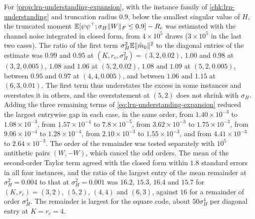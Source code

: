 \begin{numcheck}\label{chk:lrn-expansion}
For \cref{prop:lrn-understanding-expansion}, with the instance family of \cref{chk:lrn-understanding} and truncation radius $0.9$, below the smallest singular value of $H$, the truncated moment $\mathbb{E}[\psi\psi^\top;\sigma_H\Vert W\Vert_F\le0.9]-R_c$ was estimated with the channel noise integrated in closed form, from $4\times10^5$ draws ($3\times10^5$ in the last two cases). The ratio of the first term $\sigma_H^2\mathbb{E}\Vert\hat m_0\Vert^2$ to the diagonal entries of the estimate was $0.99$ and $0.95$ at $(K,r_c,\sigma_H^2)=(3,2,0.02)$, $1.00$ and $0.98$ at $(3,2,0.005)$, $1.08$ and $1.06$ at $(5,2,0.02)$, $1.08$ and $1.09$ at $(5,2,0.005)$, between $0.95$ and $0.97$ at $(4,4,0.005)$, and between $1.06$ and $1.15$ at $(6,3,0.01)$. The first term thus understates the excess in some instances and overstates it in others, and the overstatement at $(5,2)$ does not shrink with $\sigma_H$. Adding the three remaining terms of \cref{eq:lrn-understanding-expansion} reduced the largest entrywise gap in each case, in the same order, from $1.40\times10^{-3}$ to $1.08\times10^{-3}$, from $1.57\times10^{-4}$ to $7.8\times10^{-5}$, from $3.62\times10^{-3}$ to $1.75\times10^{-3}$, from $9.06\times10^{-4}$ to $1.28\times10^{-4}$, from $2.10\times10^{-3}$ to $1.55\times10^{-3}$, and from $4.41\times10^{-3}$ to $2.64\times10^{-3}$. The order of the remainder was tested separately with $10^5$ antithetic pairs $(W,-W)$, which cancel the odd orders. The mean of the second-order Taylor term agreed with the closed form within $1.8$ standard errors in all four instances, and the ratio of the largest entry of the mean remainder at $\sigma_H^2=0.004$ to that at $\sigma_H^2=0.001$ was $16.2$, $15.3$, $16.4$ and $15.7$ for $(K,r_c)=(3,2)$, $(5,2)$, $(4,4)$ and $(6,3)$, against $16$ for a remainder of order $\sigma_H^4$. The remainder is largest for the square code, about $50\sigma_H^4$ per diagonal entry at $K=r_c=4$.
\end{numcheck}


